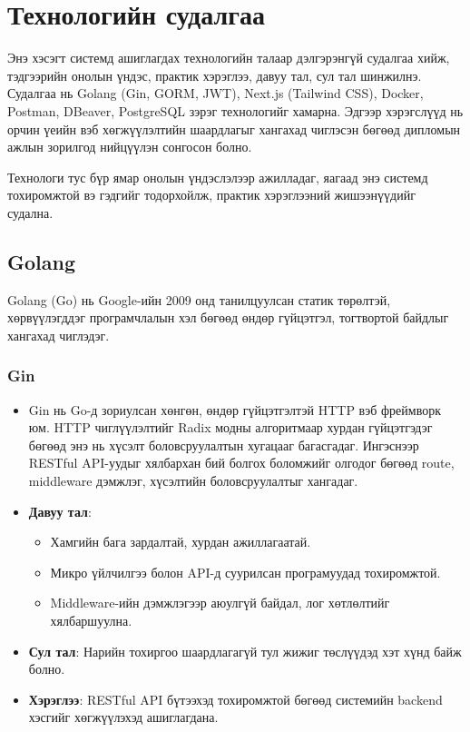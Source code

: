 

\newpage
\section{Технологийн судалгаа}
Энэ хэсэгт системд ашиглагдах технологийн талаар дэлгэрэнгүй судалгаа хийж, тэдгээрийн онолын үндэс, 
практик хэрэглээ, давуу тал, сул тал шинжилнэ. Судалгаа нь Golang (Gin, GORM, JWT), Next.js (Tailwind CSS), 
Docker, Postman, DBeaver, PostgreSQL зэрэг технологийг хамарна. Эдгээр хэрэгслүүд нь орчин үеийн вэб 
хөгжүүлэлтийн шаардлагыг хангахад чиглэсэн бөгөөд дипломын ажлын зорилгод нийцүүлэн сонгосон болно.

Технологи тус бүр ямар онолын үндэслэлээр ажилладаг, яагаад энэ системд тохиромжтой вэ гэдгийг 
тодорхойлж, практик хэрэглээний жишээнүүдийг судална.

\subsection{Golang}
Golang (Go) нь Google-ийн 2009 онд танилцуулсан статик төрөлтэй, хөрвүүлэгддэг програмчлалын 
хэл бөгөөд өндөр гүйцэтгэл, тогтвортой байдлыг хангахад чиглэдэг.

\subsubsection{Gin}
\begin{itemize}
    \item Gin нь Go-д зориулсан хөнгөн, өндөр гүйцэтгэлтэй HTTP вэб фреймворк юм. HTTP 
    чиглүүлэлтийг Radix модны алгоритмаар хурдан гүйцэтгэдэг бөгөөд энэ нь хүсэлт 
    боловсруулалтын хугацааг багасгадаг. Ингэснээр RESTful API-уудыг хялбархан бий болгох 
    боломжийг олгодог бөгөөд route, middleware дэмжлэг, хүсэлтийн боловсруулалтыг хангадаг.
    \item \textbf{Давуу тал}: 
    \begin{itemize}
        \item Хамгийн бага зардалтай, хурдан ажиллагаатай.
        \item Микро үйлчилгээ болон API-д суурилсан програмуудад тохиромжтой.
        \item Middleware-ийн дэмжлэгээр аюулгүй байдал, лог хөтлөлтийг хялбаршуулна.
    \end{itemize}
    \item \textbf{Сул тал}: Нарийн тохиргоо шаардлагагүй тул жижиг төслүүдэд хэт хүнд байж болно.
    \item \textbf{Хэрэглээ}: RESTful API бүтээхэд тохиромжтой бөгөөд системийн backend хэсгийг 
    хөгжүүлэхэд ашиглагдана.
\end{itemize}

